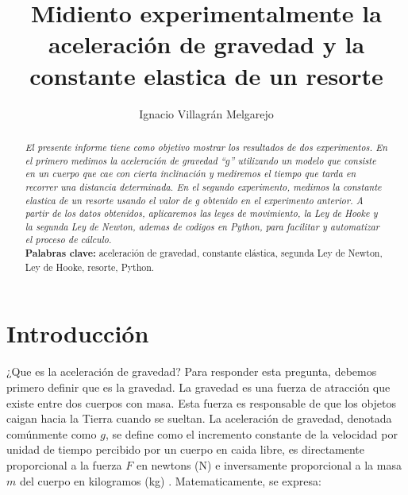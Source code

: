 \documentclass{article}
\title{\huge Midiento experimentalmente la aceleración de gravedad y
la constante elastica de un resorte}
\author{Ignacio Villagrán Melgarejo}
\begin{document}
\maketitle


\begin{abstract}
{\em El presente informe tiene como objetivo mostrar los resultados de dos
experimentos. En el primero medimos la 
aceleración de gravedad ``$g$'' utilizando un modelo que consiste en un cuerpo
que cae con cierta inclinación y mediremos el tiempo que tarda en recorrer
una distancia determinada. En el segundo experimento, medimos la constante
elastica de un resorte usando el valor de g obtenido en el experimento
anterior. A partir de los datos obtenidos, aplicaremos las leyes de
movimiento, la Ley de Hooke y la segunda Ley de Newton, ademas de codigos en
Python, para facilitar y automatizar el proceso de cálculo.} \\

{\bf Palabras clave:} aceleración de gravedad, constante elástica, segunda 
Ley de Newton, Ley de Hooke, resorte, Python.\\
\end{abstract}

\section*{Introducción}
¿Que es la aceleración de gravedad? Para responder esta pregunta,
debemos primero definir que es la gravedad. La gravedad es una fuerza
de atracción que existe entre dos cuerpos con masa. Esta fuerza es
responsable de que los objetos caigan hacia la Tierra cuando se sueltan.
La aceleración de gravedad, denotada comúnmente como $g$, se define como
el incremento constante de la velocidad por unidad de tiempo percibido
por un cuerpo en caida libre, es directamente proporcional a la fuerza $F$
en newtons (N) e inversamente proporcional a la masa $m$ del cuerpo en
kilogramos (kg) \cite{metas2002}. Matematicamente, se expresa:
\end{document}
